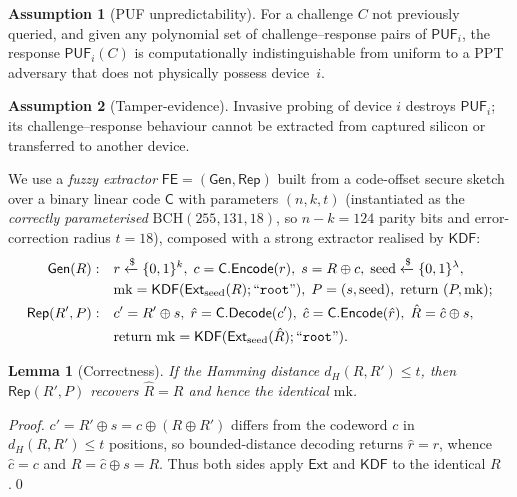 \documentclass[11pt]{article}
\theoremstyle{plain}
\newtheorem{lemma}[theorem]{Lemma}
\theoremstyle{definition}
\newtheorem{assumption}{Assumption}
\newcommand{\PUF}{\mathsf{PUF}}
\newcommand{\mk}{\mathrm{mk}}
\newcommand{\KDF}{\mathsf{KDF}}
\newcommand{\Ext}{\mathsf{Ext}}
\newcommand{\Code}{\mathsf{C}}
\newcommand{\Gen}{\mathsf{Gen}}
\newcommand{\Rep}{\mathsf{Rep}}
\newcommand{\FE}{\mathsf{FE}}
\newcommand{\secpar}{\lambda}
\newcommand{\bits}{\{0,1\}}
\newcommand{\getsr}{\xleftarrow{\$}}
\newcommand{\lbl}[1]{\text{``}\texttt{#1}\text{''}}
\newcommand{\xor}{\oplus}
\begin{document}
\begin{assumption}[PUF unpredictability]\label{ass:puf}
For a challenge $C$ not previously queried, and given any polynomial set of
challenge--response pairs of $\PUF_i$, the response $\PUF_i(C)$ is
computationally indistinguishable from uniform to a PPT adversary that does
not physically possess device~$i$.
\end{assumption}

\begin{assumption}[Tamper-evidence]\label{ass:tamper}
Invasive probing of device $i$ destroys $\PUF_i$; its challenge--response
behaviour cannot be extracted from captured silicon or transferred to
another device.
\end{assumption}

We use a \emph{fuzzy extractor} $\FE=(\Gen,\Rep)$ built from a code-offset
secure sketch over a binary linear code $\Code$ with parameters $(n,k,t)$
(instantiated as the \emph{correctly parameterised} $\mathrm{BCH}(255,131,18)$,
so $n-k=124$ parity bits and error-correction radius $t=18$), composed with
a strong extractor realised by $\KDF$:
\begin{align}
\Gen(R):\quad & r\getsr\bits^{k},\; c=\Code.\mathsf{Encode}(r),\;
  s = R\xor c,\; \text{seed}\getsr\bits^\secpar,\notag\\
  & \mk=\KDF(\Ext_{\text{seed}}(R);\lbl{root}),\;
  P=(s,\text{seed}),\; \text{return }(P,\mk);\label{eq:gen}\\
\Rep(R',P):\quad & c' = R'\xor s,\; \hat r=\Code.\mathsf{Decode}(c'),\;
  \hat c=\Code.\mathsf{Encode}(\hat r),\; \hat R = \hat c \xor s,\notag\\
  & \text{return } \mk=\KDF(\Ext_{\text{seed}}(\hat R);\lbl{root}).
  \label{eq:rep}
\end{align}

\begin{lemma}[Correctness]\label{lem:fecorrect}
If the Hamming distance $d_H(R,R')\le t$, then $\Rep(R',P)$ recovers
$\hat R = R$ and hence the identical $\mk$.
\end{lemma}
\begin{proof}
$c' = R'\xor s = c \xor (R\xor R')$ differs from the codeword $c$ in
$d_H(R,R')\le t$ positions, so bounded-distance decoding returns
$\hat r=r$, whence $\hat c=c$ and $\hat R=\hat c\xor s = R$. Thus both sides
apply $\Ext$ and $\KDF$ to the identical $R$.\qed
\end{proof}
\end{document}
